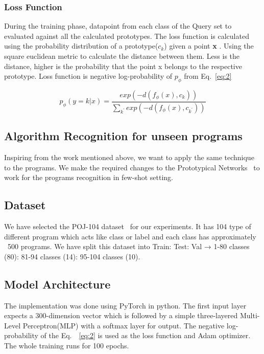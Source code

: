 \subsubsection{Loss Function}\label{sec:algo:proto:loss}
During the training phase, datapoint from each class of the Query set to evaluated against all the calculated prototypes. The loss function is calculated using the probability distribution of a prototype($c_{k}$) given a point \textbf{x} . Using the square euclidean metric to calculate the distance between them. Less is the distance, higher is the probability that the point x belongs to the respective prototype. Loss function is negative log-probability of $p_{\phi}$ from Eq.~\ref{eq:2} %

\begin{equation}\label{eq:2}
p_{ \phi }(y = k | x) =  \frac{exp(-d(f_{\phi}(x), c_{k}))}{\sum_{k^{'} }exp(-d(f_{\phi}(x), c_{k^{'}}))} 
\end{equation}

\subsection{Algorithm Recognition for unseen programs}
Inspiring from the work mentioned above, we want to apply the same technique to the programs. We make the required changes to the Prototypical Networks~\cite{protonet:NIPS2017} to work for the programs recognition in few-shot setting.  

\subsection{Dataset}
We have selected the POJ-104 dataset~\cite{tbcnn-aaai16} for our experiments. It has 104 type of different program which acts like class or label and each class has approximately ~500 programs. We have split this dataset into Train: Test: Val →  1-80 classes (80): 81-94 classes (14): 95-104 classes (10).

\subsection{Model Architecture}
The implementation was done using PyTorch in python. The first input layer expects a 300-dimension vector which is followed by a simple three-layered Multi-Level Perceptron(MLP) with a softmax layer for output. The negative log-probability of the Eq.~~\ref{eq:2} is used as the loss function and Adam optimizer. The whole training runs for 100 epochs.

